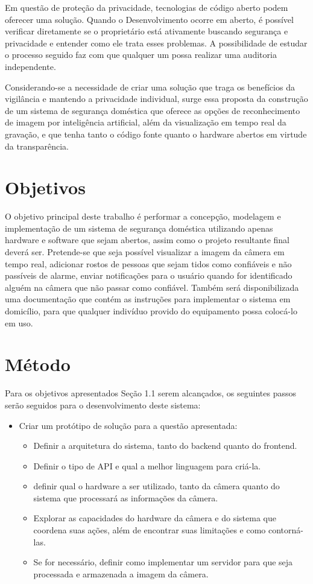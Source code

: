 \documentclass[12pt, %
openright, 
oneside, %
a4paper,    %
brazil]{facom-ufu-abntex2}
\begin{document}
Em questão de proteção da privacidade, tecnologias de código aberto podem oferecer uma solução. Quando o Desenvolvimento
ocorre em aberto, é possível verificar diretamente se o proprietário está ativamente buscando segurança e privacidade e
entender como ele trata esses problemas. A possibilidade de estudar o processo seguido faz com que qualquer um possa
realizar uma auditoria independente. \cite{mardjan2016open}

Considerando-se a necessidade de criar uma solução que traga os benefícios da vigilância e mantendo a privacidade individual, surge
essa proposta da construção de um sistema de segurança doméstica que oferece as opções de reconhecimento de imagem
por inteligência artificial, além da visualização em tempo real da gravação, e que tenha tanto o código fonte quanto o hardware
abertos em virtude da transparência.

\section{Objetivos}

O objetivo principal deste trabalho é performar a concepção, modelagem e implementação de um sistema de segurança doméstica utilizando
apenas hardware e software que sejam abertos, assim como o projeto resultante final deverá ser. Pretende-se que seja possível visualizar 
a imagem da câmera em tempo real, adicionar rostos de pessoas que sejam tidos como confiáveis e não passíveis de alarme, enviar notificações
para o usuário quando for identificado alguém na câmera que não passar como confiável. Também será disponibilizada uma documentação que 
contém as instruções para implementar o sistema em domicílio, para que qualquer indivíduo provido do equipamento possa colocá-lo em uso.

\section{Método}

Para os objetivos apresentados Seção 1.1 serem alcançados, os seguintes passos serão seguidos para o desenvolvimento deste sistema:

\begin{itemize}
    \item  Criar um protótipo de solução para a questão apresentada:
    \begin{itemize}
      \item Definir a arquitetura do sistema, tanto do backend quanto do frontend.
      \item Definir o tipo de API e qual a melhor linguagem para criá-la.
      \item definir qual o hardware a ser utilizado, tanto da câmera quanto do sistema que processará as informações da câmera. 
      \item Explorar as capacidades do hardware da câmera e do sistema que coordena suas ações, além de encontrar suas limitações e como contorná-las.
      \item Se for necessário, definir como implementar um servidor para que seja processada e armazenada a imagem da câmera.
  \end{itemize}
\end{itemize}
\end{document}
